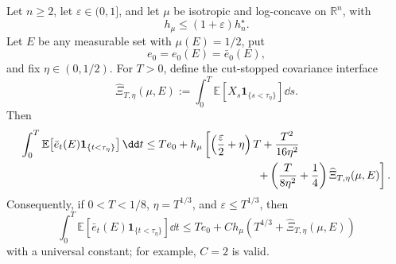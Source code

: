 \documentclass[../main.tex]{subfiles}
\begin{document}
\begin{theorem}
\label{thm:sol-bootstrap-stopped-interface}
Let $n\geq2$, let $\varepsilon\in(0,1]$, and let $\mu$ be isotropic and log-concave on
$\mathbb R^n$, with
\[
  h_\mu\leq(1+\varepsilon)h_n^\star.
\]
Let $E$ be any measurable set with $\mu(E)=1/2$, put
\[
  e_0=e_0(E)=\bar e_0(E),
\]
and fix $\eta\in(0,1/2)$.  For $T>0$, define the cut-stopped covariance interface
\begin{equation}
  \widehat\Xi_{T,\eta}(\mu,E)
  :=\int_0^T\mathbb E\!\left[X_s\mathbf1_{\{s<\tau_\eta\}}\right]\dd s.
  \label{eq:sol-stopped-interface-definition}
\end{equation}
Then
\begin{equation}
\begin{split}
  \int_0^T\mathbb E\!\left[
       \bar e_t(E)\mathbf1_{\{t<\tau_\eta\}}\right]\dd t
  \leq{}&T e_0+h_\mu\left[
       \left(\frac\varepsilon2+\eta\right)T
       +\frac{T^2}{16\eta^2}\right.\\
      &\left.\hspace{31mm}
       +\left(\frac{T}{8\eta^2}+\frac14\right)
        \widehat\Xi_{T,\eta}(\mu,E)\right].
\end{split}
\label{eq:sol-bootstrap-stopped-interface}
\end{equation}
Consequently, if $0<T<1/8$, $\eta=T^{1/3}$, and
$\varepsilon\leq T^{1/3}$, then
\begin{equation}
  \int_0^T\mathbb E\!\left[
       \bar e_t(E)\mathbf1_{\{t<\tau_\eta\}}\right]\dd t
  \leq T e_0+C h_\mu\left(
       T^{4/3}+\widehat\Xi_{T,\eta}(\mu,E)\right)
  \label{eq:sol-bootstrap-stopped-interface-clean}
\end{equation}
with a universal constant; for example, $C=2$ is valid.
\end{theorem}
\end{document}
